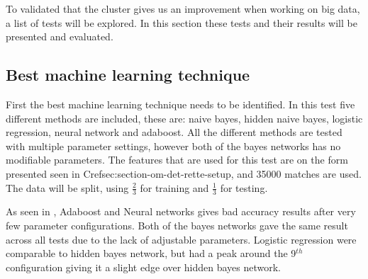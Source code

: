 To validated that the cluster gives us an improvement when working on big data, a list of tests will be explored. In this section these tests and their results will be presented and evaluated.

\subsection{Best machine learning technique}
First the best machine learning technique needs to be identified. In this test five different methods are included, these are: naive bayes, hidden naive bayes, logistic regression, neural network and adaboost. All the different methods are tested with multiple parameter settings, however both of the bayes networks has no modifiable parameters. The features that are used for this test are on the form presented seen in Cref{sec:section-om-det-rette-setup}, and 35000 matches are used. The data will be split, using $\frac{2}{3}$ for training and $\frac{1}{3}$ for testing. 

As seen in , Adaboost and Neural networks gives bad accuracy results after very few parameter configurations. Both of the bayes networks gave the same result across all tests due to the lack of adjustable parameters. Logistic regression were comparable to hidden bayes network, but had a peak around the 9$^{th}$ configuration giving it a slight edge over hidden bayes network.

